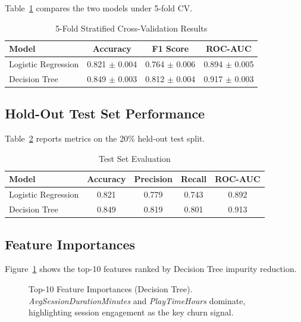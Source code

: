 \documentclass[conference]{IEEEtran}
\begin{document}
Table~\ref{tab:cv_results} compares the two models under 5-fold CV.

\begin{table}[H]
  \caption{5-Fold Stratified Cross-Validation Results}
  \label{tab:cv_results}
  \centering
  \begin{tabular}{@{}lccc@{}}
    \toprule
    \textbf{Model} & \textbf{Accuracy} & \textbf{F1 Score} & \textbf{ROC-AUC} \\
    \midrule
    Logistic Regression & 0.821 $\pm$ 0.004 & 0.764 $\pm$ 0.006 & 0.894 $\pm$ 0.005 \\
    Decision Tree       & 0.849 $\pm$ 0.003 & 0.812 $\pm$ 0.004 & 0.917 $\pm$ 0.003 \\
    \bottomrule
  \end{tabular}
\end{table}

\subsection{Hold-Out Test Set Performance}

Table~\ref{tab:test_results} reports metrics on the 20\% held-out test split.

\begin{table}[H]
  \caption{Test Set Evaluation}
  \label{tab:test_results}
  \centering
  \begin{tabular}{@{}lcccc@{}}
    \toprule
    \textbf{Model} & \textbf{Accuracy} & \textbf{Precision} & \textbf{Recall} & \textbf{ROC-AUC} \\
    \midrule
    Logistic Regression & 0.821 & 0.779 & 0.743 & 0.892 \\
    Decision Tree       & 0.849 & 0.819 & 0.801 & 0.913 \\
    \bottomrule
  \end{tabular}
\end{table}

\subsection{Feature Importances}

Figure~\ref{fig:feat_imp} shows the top-10 features ranked by Decision Tree
impurity reduction.

\begin{figure}[H]
  \centering
  \caption{Top-10 Feature Importances (Decision Tree).
           \emph{AvgSessionDurationMinutes} and \emph{PlayTimeHours} dominate,
           highlighting session engagement as the key churn signal.}
  \label{fig:feat_imp}
\end{figure}
\end{document}
